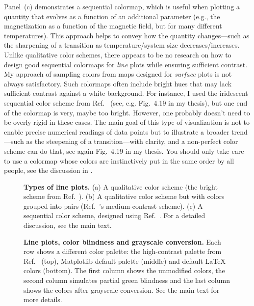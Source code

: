 Panel~(c) demonstrates a sequential colormap, which is useful when plotting a quantity that evolves as a function of an additional parameter (e.g., the magnetization as a function of the magnetic field, but for many different temperatures). This approach helps to convey how the quantity changes---such as the sharpening of a transition as temperature/system size decreases/increases.
Unlike qualitative color schemes, there appears to be no research on how to design good sequential colormaps for \emph{line} plots while ensuring sufficient contrast. My approach of sampling colors from maps designed for \emph{surface} plots is not always satisfactory. Such colormaps often include bright hues that may lack sufficient contrast against a white background. For instance, I used the iridescent sequential color scheme from Ref.~\cite{paultol} (see, e.g. Fig.~4.19 in my thesis), but one end of the colormap is very, maybe too bright. However, one probably doesn't need to be overly rigid in these cases. The main goal of this type of visualization is not to enable precise numerical readings of data points but to illustrate a broader trend---such as the steepening of a transition---with clarity, and a non-perfect color scheme can do that, see again Fig.~4.19 in my thesis. You should only take care to use a colormap whose colors are instinctively put in the same order by all people, see the discussion in .

\begin{figure}
	\centering
	
	\caption{\textbf{Types of line plots.} (a) A qualitative color scheme (the bright scheme from Ref.~\cite{paultol}). (b) A qualitative color scheme but with colors grouped into pairs (Ref.~\cite{paultol}'s medium-contrast scheme). (c) A sequential color scheme, designed using Ref.~\cite{chromajs}. For a detailed discussion, see the main text.}
	\label{fig:lineplotflavour}
\end{figure}


\begin{figure}
	\centering 
	
	\caption{\textbf{Line plots, color blindness and grayscale conversion.} Each row shows a different color palette: the high-contrast palette from Ref.~\cite{paultol} (top), Matplotlib default palette (middle) and default \LaTeX{} colors (bottom). The first column shows the unmodified colors, the second column simulates partial green blindness and the last column shows the colors after grayscale conversion. See the main text for more details.}
	\label{fig:lineplotcolorblindness}
\end{figure}

